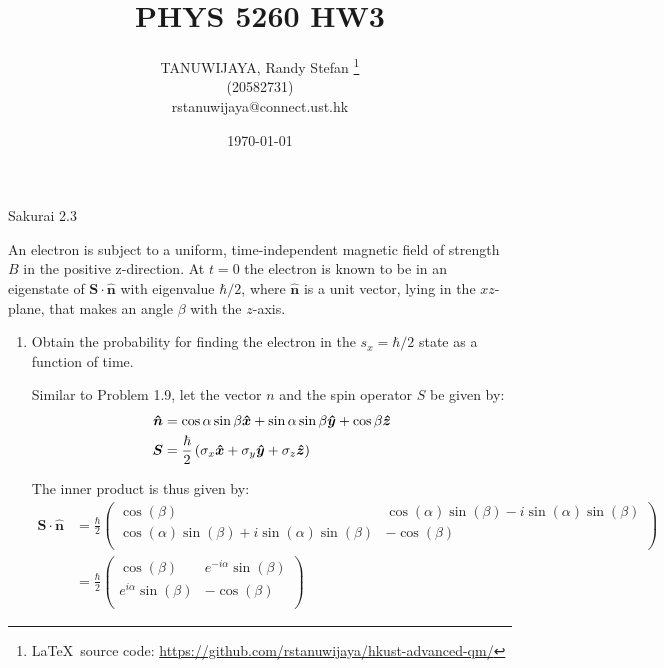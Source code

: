 \documentclass{article}
\title{PHYS 5260 HW3}
\author{TANUWIJAYA, Randy Stefan \footnote{\LaTeX\ source code: \url{https://github.com/rstanuwijaya/hkust-advanced-qm/}}
\\ (20582731) \\ rstanuwijaya@connect.ust.hk}
\affil{Department of Physics - HKUST}
\date{\today}
\newcommand{\bs}{\boldsymbol}
\begin{document}
\maketitle
\begin{section}{Sakurai 2.3}
\newcommand{\sdotn}{\boldsymbol{S \cdot \hat{n}}}
\newcommand{\sdotnplus}{\ket{\sdotn; +}}

An electron is subject to a uniform, time-independent magnetic field of strength $B$ in the positive z-direction. At $t= 0$ the electron is known to be in an eigenstate of $\bs{S \cdot \hat{n}}$ with eigenvalue $\hbar /2 $, where $\bs{\hat n}$ is a unit vector, lying in the $xz$-plane, that makes an angle $\beta$ with the $z$-axis.

\begin{enumerate}
	\item Obtain the probability for finding the electron in the $s_x = \hbar/2$ state as a function of time.

	\begin{tcolorbox}[breakable]
		Similar to Problem 1.9, let the vector $n$ and the spin operator $S$ be given by:
		\begin{align*}
			\boldsymbol{\hat{n}} & = \cos{\alpha}\sin{\beta} \boldsymbol{\hat{x}} + \sin{\alpha}\sin{\beta} \boldsymbol{\hat{y}} + \cos{\beta} \boldsymbol{\hat{z}} \\
			\boldsymbol{S}       & = \frac{\hbar}{2} \left(\sigma_x \boldsymbol{\hat{x}} + \sigma_y \boldsymbol{\hat{y}} + \sigma_z \boldsymbol{\hat{z}}\right)
		\end{align*}

		The inner product is thus given by:
		\begin{align*}
			\sdotn & = \frac{\hbar}{2}
			\left(
			\begin{array}{cc}
					\cos (\beta )                                               & \cos (\alpha ) \sin (\beta )-i \sin (\alpha ) \sin (\beta ) \\
					\cos (\alpha ) \sin (\beta )+i \sin (\alpha ) \sin (\beta ) & -\cos (\beta )                                              \\
				\end{array}
			\right)                    \\
			       & = \frac{\hbar}{2}
			\left(
			\begin{array}{cc}
					\cos (\beta )              & e^{-i \alpha} \sin (\beta ) \\
					e^{i \alpha} \sin (\beta ) & -\cos (\beta )              \\
				\end{array}
			\right)
		\end{align*}


\end{tcolorbox}
\end{enumerate}
\end{section}
\end{document}
